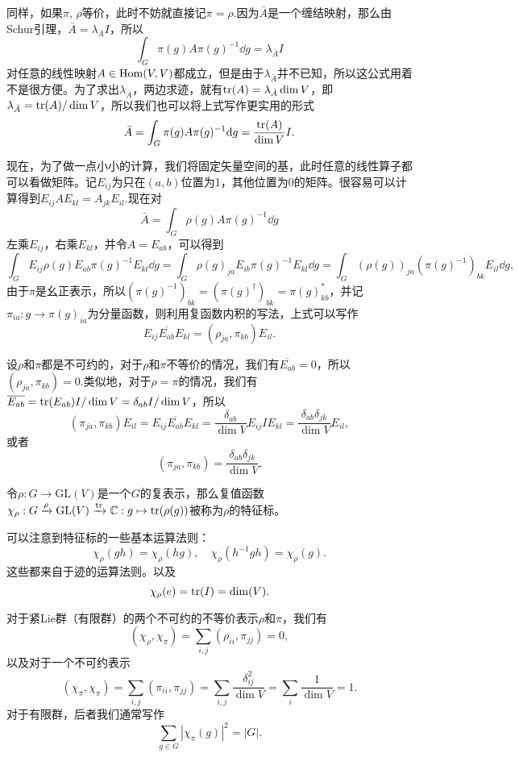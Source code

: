 \documentclass[9pt]{extarticle}
\newcommand{\cc}{\mathbb{C}}
\begin{document}
同样，如果$\pi$, $\rho$等价，此时不妨就直接记$\pi=\rho$.因为$\bar{A}$是一个缠结映射，那么由Schur引理，$\bar{A}=\lambda_{\bar{A}} I$，所以
\[
	\int_G \pi(g)A\pi(g)^{-1}\dd g=\lambda_{\bar{A}} I
\]
对任意的线性映射$A\in \operatorname{Hom}(V,V)$都成立，但是由于$\lambda_{\bar{A}}$并不已知，所以这公式用着不是很方便。为了求出$\lambda_{\bar{A}}$，两边求迹，就有$\operatorname{tr}(A)=\lambda_{\bar{A}} \dim V$，即$\lambda_{\bar{A}}=\operatorname{tr}(A)/\dim V$，所以我们也可以将上式写作更实用的形式
\[
	\bar{A}=\int_G \pi(g)A\pi(g)^{-1}\mathrm{d} g=\frac{\operatorname{tr}(A)}{\dim V}I.
\]

\para 现在，为了做一点小小的计算，我们将固定矢量空间的基，此时任意的线性算子都可以看做矩阵。记$E_{ij}$为只在$(a,b)$位置为1，其他位置为0的矩阵。很容易可以计算得到$E_{ij}AE_{kl}=A_{jk}E_{il}$.现在对
\[
	\bar{A}=\int_G \rho(g)A\pi(g)^{-1}\dd g
\]
左乘$E_{ij}$，右乘$E_{kl}$，并令$A=E_{ab}$，可以得到
\[
	\int_G E_{ij}\rho(g)E_{ab}\pi(g)^{-1}E_{kl}\dd g=\int_G \rho(g)_{ja}E_{ib}\pi(g)^{-1}E_{kl}\dd g=\int_G (\rho(g))_{ja}\left(\pi(g)^{-1}\right)_{bk}E_{il}\dd g,
\]
由于$\pi$是幺正表示，所以$\left(\pi(g)^{-1}\right)_{bk}=\left(\pi(g)^{\dag}\right)_{bk}=\pi(g)_{kb}^*$，并记$\pi_{ia}:g\to \pi(g)_{ia}$为分量函数，则利用复函数内积的写法，上式可以写作
\[
	E_{ij}\overline{E_{ab}}E_{kl}=\left(\rho_{ja},\pi_{kb}\right)E_{il}.
\]

\para 设$\rho$和$\pi$都是不可约的，对于$\rho$和$\pi$不等价的情况，我们有$\overline{E_{ab}}=0$，所以$\left(\rho_{ja},\pi_{kb}\right)=0$.类似地，对于$\rho=\pi$的情况，我们有$\overline{E_{ab}}=\operatorname{tr}(E_{ab})I/\dim V=\delta_{ab}I/\dim V$，所以
\[
	\left(\pi_{ja},\pi_{kb}\right)E_{il}=E_{ij}\overline{E_{ab}}E_{kl}=\frac{\delta_{ab}}{\dim V}E_{ij}IE_{kl}=\frac{\delta_{ab}\delta_{jk}}{\dim V}E_{il},
\]
或者
\[
	\left(\pi_{ja},\pi_{kb}\right)=\frac{\delta_{ab}\delta_{jk}}{\dim V}.
\]

\para 令$\rho:G\to \mathrm{GL}(V)$是一个$G$的复表示，那么复值函数$\chi_\rho:G\xrightarrow{\rho}\mathrm{GL}(V)\xrightarrow{\tr}\cc:g\mapsto \tr(\rho(g))$被称为$\rho$的特征标。

可以注意到特征标的一些基本运算法则：
\[
	\chi_\rho(gh)=\chi_\rho(hg),\quad \chi_\rho(h^{-1}gh)= \chi_\rho(g).
\]
这些都来自于迹的运算法则。以及
\[
	\chi_\rho(e)=\operatorname{tr}(I)=\dim(V).
\]

\para 对于紧Lie群（有限群）的两个不可约的不等价表示$\rho$和$\pi$，我们有
\[
(\chi_\rho, \chi_\pi)=\sum_{i,j}\left(\rho_{ii},\pi_{jj}\right)=0,
\]
以及对于一个不可约表示
\[
(\chi_\pi, \chi_\pi)=\sum_{i,j}(\pi_{ii},\pi_{jj})=\sum_{i,j}\frac{\delta_{ij}^2}{\dim V}=\sum_{i}\frac{1}{\dim V}=1.
\]
对于有限群，后者我们通常写作
\[
	\sum_{g\in G} |\chi_\pi(g)|^2=|G|.
\]
\end{document}

